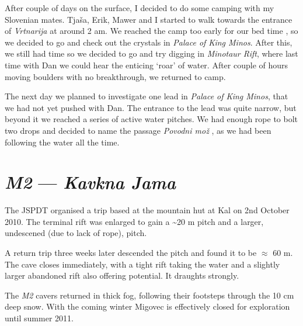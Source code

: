 After couple of days on the surface, I decided to do some camping with
my Slovenian mates. Tjaša, Erik, Mawer and I started to walk towards the
entrance of \emph{Vrtnarija} at around 2 am. We reached the camp too
early for our bed time
, so we
decided to go and check out the crystals in \emph{Palace of King Minos}.
After this, we still had time so we decided to go and try digging in
\emph{Minotaur Rift}, where last time with Dan we could hear the
enticing `roar' of water. After couple of hours moving boulders with no
breakthrough, we returned to camp.

The next day we planned to investigate one lead in \emph{Palace of King
Minos}, that we had not yet pushed with Dan. The entrance to the lead
was quite narrow, but beyond it we reached a series of active water
pitches. We had enough rope to bolt two drops and decided to name the
passage \emph{Povodni mož} , as we had been
following the water all the time.



\section{\texorpdfstring{\emph{M2} --- \emph{Kavkna
Jama}}{M2 --- Kavkna Jama}}

The JSPDT organised a trip based at the mountain hut at Kal on 2nd
October 2010. The terminal rift was enlarged to gain a
\textasciitilde 20 m pitch and a larger, undescened (due to lack of
rope), pitch.

A return trip three weeks later descended the pitch and found it to be
\(\approx\) 60 m. The cave closes immediately, with a tight rift taking
the water and a slightly larger abandoned rift also offering potential.
It draughts strongly.

The \emph{M2} cavers returned in thick fog, following their footsteps
through the 10 cm deep snow. With the coming winter Migovec is
effectively closed for exploration until summer 2011.
